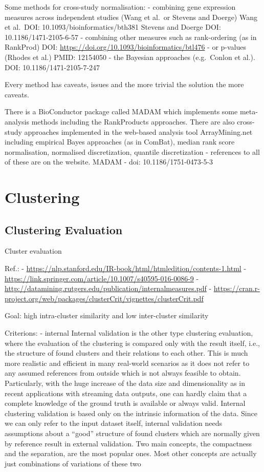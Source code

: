 \documentclass[
]{book}
\begin{document}
Some methods for cross-study normalisation:
- combining gene expression measures across independent studies (Wang et al.~or Stevens and Doerge)
Wang et al.~DOI: 10.1093/bioinformatics/bth381
Stevens and Doerge DOI: 10.1186/1471-2105-6-57
- combining other measures such as rank-ordering (as in RankProd)
DOI: \url{https://doi.org/10.1093/bioinformatics/btl476}
- or p-values (Rhodes et al.)
PMID: 12154050
- the Bayesian approaches (e.g.~Conlon et al.).
DOI: 10.1186/1471-2105-7-247

Every method has caveats, issues and the more trivial the solution the more caveats.

There is a BioConductor package called MADAM which implements some meta-analysis methods including the RankProducts approaches. There are also cross-study approaches implemented in the web-based analysis tool ArrayMining.net including empirical Bayes approaches (as in ComBat), median rank score normalisation, normalised discretization, quantile discretization - references to all of these are on the website.
MADAM - doi: 10.1186/1751-0473-5-3

\hypertarget{clustering}{%
\section{Clustering}\label{clustering}}

\hypertarget{clustering-evaluation}{%
\subsection{Clustering Evaluation}\label{clustering-evaluation}}

Cluster evaluation

Ref.:
- \url{https://nlp.stanford.edu/IR-book/html/htmledition/contents-1.html}
- \url{https://link.springer.com/article/10.1007/s40595-016-0086-9}
- \url{http://datamining.rutgers.edu/publication/internalmeasures.pdf}
- \url{https://cran.r-project.org/web/packages/clusterCrit/vignettes/clusterCrit.pdf}

Goal: high intra-cluster similarity and low inter-cluster similarity

Criterions:
- internal
Internal validation is the other type clustering evaluation, where the evaluation of the clustering is compared only with the result itself, i.e., the structure of found clusters and their relations to each other. This is much more realistic and efficient in many real-world scenarios as it does not refer to any assumed references from outside which is not always feasible to obtain. Particularly, with the huge increase of the data size and dimensionality as in recent applications with streaming data outputs, one can hardly claim that a complete knowledge of the ground truth is available or always valid.
Internal clustering validation is based only on the intrinsic information of the data. Since we can only refer to the input dataset itself, internal validation needs assumptions about a ``good'' structure of found clusters which are normally given by reference result in external validation. Two main concepts, the compactness and the separation, are the most popular ones. Most other concepts are actually just combinations of variations of these two
\end{document}
